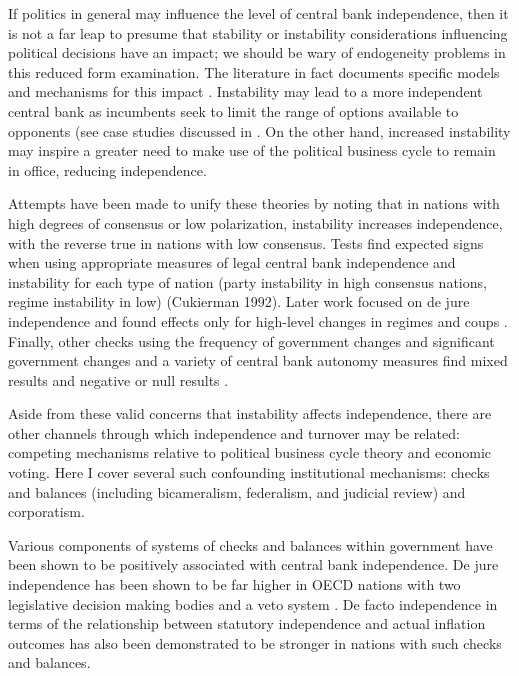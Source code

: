 \documentclass{article}
\begin{document}
    If politics in general may influence the level of central bank independence, then it is not a far leap to presume that stability or instability considerations influencing political decisions have an impact; we should be wary of endogeneity problems in this reduced form examination. The literature in fact documents specific models and mechanisms for this impact \citep{eijffinger_political_1996}. Instability may lead to a more independent central bank as incumbents seek to limit the range of options available to opponents (see case studies discussed in \citep{goodman_politics_1991}. On the other hand, increased instability may inspire a greater need to make use of the political business cycle to remain in office, reducing independence.
   
    Attempts have been made to unify these theories by noting that in nations with high degrees of consensus or low polarization, instability increases independence, with the reverse true in nations with low consensus. Tests find expected signs when using appropriate measures of legal central bank independence and instability for each type of nation (party instability in high consensus nations, regime instability in low) (Cukierman 1992). Later work focused on de jure independence and found effects only for high-level changes in regimes and coups \citep{cukierman_political_1995,haan_central_1996}. Finally, other checks using the frequency of government changes and significant government changes and a variety of central bank autonomy measures find mixed results and negative or null results \citep{de_haan_variation_1995}.
   
    Aside from these valid concerns that instability affects independence, there are other channels through which independence and turnover may be related: competing mechanisms relative to political business cycle theory and economic voting. Here I cover several such confounding institutional mechanisms: checks and balances (including bicameralism, federalism, and judicial review) and corporatism.
   
    Various components of systems of checks and balances within government have been shown to be positively associated with central bank independence. De jure independence has been shown to be far higher in OECD nations with two legislative decision making bodies and a veto system \citep{moser_checks_1999}. De facto independence in terms of the relationship between statutory independence and actual inflation outcomes has also been demonstrated to be stronger in nations with such checks and balances.
   
\end{document}
